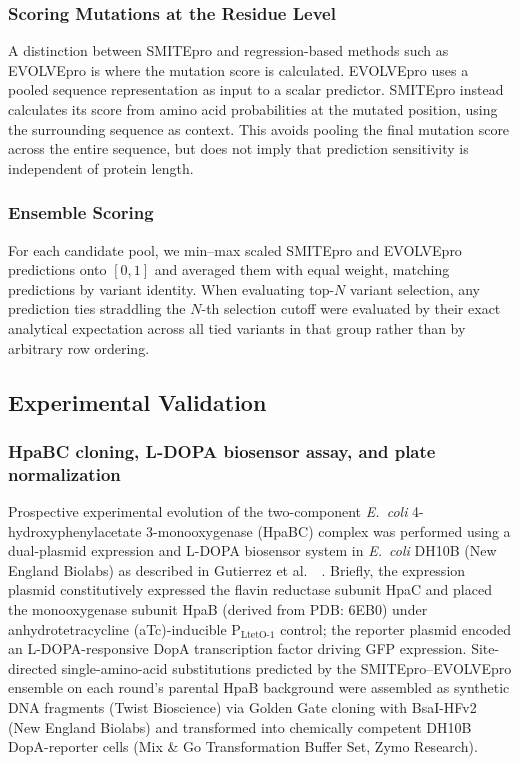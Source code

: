 \documentclass[sn-nature]{sn-jnl}
\begin{document}
    \subsubsection{Scoring Mutations at the Residue Level}
    A distinction between SMITEpro and regression-based methods such as EVOLVEpro is where the mutation score is calculated. EVOLVEpro uses a pooled sequence representation as input to a scalar predictor. SMITEpro instead calculates its score from amino acid probabilities at the mutated position, using the surrounding sequence as context. This avoids pooling the final mutation score across the entire sequence, but does not imply that prediction sensitivity is independent of protein length.
    
    \subsubsection{Ensemble Scoring}
    For each candidate pool, we min--max scaled SMITEpro and EVOLVEpro predictions onto $[0, 1]$ and averaged them with equal weight, matching predictions by variant identity. When evaluating top-$N$ variant selection, any prediction ties straddling the $N$-th selection cutoff were evaluated by their exact analytical expectation across all tied variants in that group rather than by arbitrary row ordering.

    \subsection{Experimental Validation}

    \subsubsection{HpaBC cloning, L-DOPA biosensor assay, and plate normalization}
    Prospective experimental evolution of the two-component \textit{E.~coli} 4-hydroxyphenylacetate 3-monooxygenase (HpaBC) complex was performed using a dual-plasmid expression and L-DOPA biosensor system in \textit{E.~coli} DH10B (New England Biolabs) as described in Gutierrez et al.~~\cite{gutierrez2026monooxygenase}. Briefly, the expression plasmid constitutively expressed the flavin reductase subunit HpaC and placed the monooxygenase subunit HpaB (derived from PDB: 6EB0) under anhydrotetracycline (aTc)-inducible $\text{P}_{\text{LtetO-1}}$ control; the reporter plasmid encoded an L-DOPA-responsive DopA transcription factor driving GFP expression. Site-directed single-amino-acid substitutions predicted by the SMITEpro--EVOLVEpro ensemble on each round's parental HpaB background were assembled as synthetic DNA fragments (Twist Bioscience) via Golden Gate cloning with BsaI-HFv2 (New England Biolabs) and transformed into chemically competent DH10B DopA-reporter cells (Mix \& Go Transformation Buffer Set, Zymo Research).
\end{document}

